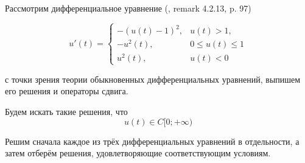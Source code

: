 Рассмотрим дифференциальное уравнение (\cite{Vorotnikov}, remark 4.2.13, p. 97)

\begin{equation}\label{primer_iz_statyi}
	u'(t)=
	\left\{
		\begin{array}{ll}
			-(u(t)-1)^2, & u(t) > 1, \\
			-u^2 (t)   , & 0 \leq u(t) \leq 1 \\
			u^2 (t)    , & u(t) < 0
		\end{array}
	\right.
\end{equation}

с точки зрения теории обыкновенных дифференциальных уравнений, выпишем его решения и операторы сдвига.

Будем искать такие решения, что
\begin{equation}
	u(t) \in C[0; +\infty)
\end{equation}

Решим сначала каждое из трёх дифференциальных уравнений в отдельности, а затем отберём решения,
удовлетворяющие соответствующим условиям.

